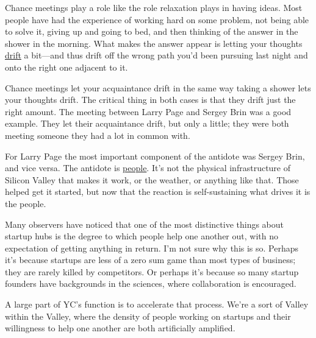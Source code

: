 Chance meetings play a role like the
                    role relaxation plays in having ideas. Most people have had
                    the experience of working hard on some problem, not being
                    able to solve it, giving up and going to bed, and then
                    thinking of the answer in the shower in the morning. What
                    makes the answer appear is letting your thoughts
                    \href{http://www.paulgraham.com/top.html}{drift} a bit---and thus drift off
                    the wrong path you'd been pursuing last night and onto the
                    right one adjacent to it.

Chance meetings let
                    your acquaintance drift in the same way taking a shower lets
                    your thoughts drift. The critical thing in both cases is
                    that they drift just the right amount. The meeting between
                    Larry Page and Sergey Brin was a good example. They let
                    their acquaintance drift, but only a little; they were both
                    meeting someone they had a lot in common with.

For
                    Larry Page the most important component of the antidote was
                    Sergey Brin, and vice versa. The antidote is
                    \href{http://www.paulgraham.com/siliconvalley.html}{people}. It's not the
                    physical infrastructure of Silicon Valley that makes it
                    work, or the weather, or anything like that. Those helped
                    get it started, but now that the reaction is self-sustaining
                    what drives it is the people.

Many observers have
                    noticed that one of the most distinctive things about
                    startup hubs is the degree to which people help one another
                    out, with no expectation of getting anything in return. I'm
                    not sure why this is so. Perhaps it's because startups are
                    less of a zero sum game than most types of business; they
                    are rarely killed by competitors. Or perhaps it's because so
                    many startup founders have backgrounds in the sciences,
                    where collaboration is encouraged.

A large part
                    of YC's function is to accelerate that process. We're a sort
                    of Valley within the Valley, where the density of people
                    working on startups and their willingness to help one
                    another are both artificially amplified.

